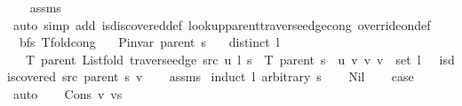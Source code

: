 \begin{isabellebody}
%
\isadelimproof
\ \ %
\endisadelimproof
%
\isatagproof
{}\isamarkupfalse%
\ assms\isanewline
\ \ \isamarkupfalse%
\ {\isacharparenleft}{\kern0pt}auto\ simp\ add{\isacharcolon}{\kern0pt}\ is{\isacharunderscore}{\kern0pt}discovered{\isacharunderscore}{\kern0pt}def\ lookup{\isacharunderscore}{\kern0pt}parent{\isacharunderscore}{\kern0pt}traverse{\isacharunderscore}{\kern0pt}edge{\isacharunderscore}{\kern0pt}cong\ override{\isacharunderscore}{\kern0pt}on{\isacharunderscore}{\kern0pt}def{\isacharparenright}{\kern0pt}%
\endisatagproof
{\isafoldproof}%
%
\isadelimproof
\isanewline
%
\endisadelimproof
\isanewline
{}\isamarkupfalse%
\ {\isacharparenleft}{\kern0pt}\ bfs{\isacharparenright}{\kern0pt}\ T{\isacharunderscore}{\kern0pt}fold{\isacharunderscore}{\kern0pt}cong{\isacharcolon}{\kern0pt}\isanewline
\ \ \ {\isachardoublequoteopen}P{\isacharunderscore}{\kern0pt}invar\ {\isacharparenleft}{\kern0pt}parent\ s{\isacharparenright}{\kern0pt}{\isachardoublequoteclose}\isanewline
\ \ \ {\isachardoublequoteopen}distinct\ l{\isachardoublequoteclose}\isanewline
\ \ \ {\isachardoublequoteopen}T\ {\isacharparenleft}{\kern0pt}parent\ {\isacharparenleft}{\kern0pt}List{\isachardot}{\kern0pt}fold\ {\isacharparenleft}{\kern0pt}traverse{\isacharunderscore}{\kern0pt}edge\ src\ u{\isacharparenright}{\kern0pt}\ l\ s{\isacharparenright}{\kern0pt}{\isacharparenright}{\kern0pt}\ {\isacharequal}{\kern0pt}\ T\ {\isacharparenleft}{\kern0pt}parent\ s{\isacharparenright}{\kern0pt}\ {\isasymunion}\ {\isacharbraceleft}{\kern0pt}{\isacharparenleft}{\kern0pt}u{\isacharcomma}{\kern0pt}\ v{\isacharparenright}{\kern0pt}\ {\isacharbar}{\kern0pt}v{\isachardot}{\kern0pt}\ v\ {\isasymin}\ set\ l\ {\isasymand}\ {\isasymnot}\ is{\isacharunderscore}{\kern0pt}discovered\ src\ {\isacharparenleft}{\kern0pt}parent\ s{\isacharparenright}{\kern0pt}\ v{\isacharbraceright}{\kern0pt}{\isachardoublequoteclose}\isanewline
%
\isadelimproof
\ \ %
\endisadelimproof
%
\isatagproof
{}\isamarkupfalse%
\ assms\isanewline
{}\isamarkupfalse%
\ {\isacharparenleft}{\kern0pt}induct\ l\ arbitrary{\isacharcolon}{\kern0pt}\ s{\isacharparenright}{\kern0pt}\isanewline
\ \ \isamarkupfalse%
\ Nil\isanewline
\ \ \isamarkupfalse%
\ {\isacharquery}{\kern0pt}case\isanewline
\ \ \ \ \isamarkupfalse%
\ auto\isanewline
{}\isamarkupfalse%
\isanewline
\ \ \isamarkupfalse%
\ {\isacharparenleft}{\kern0pt}Cons\ v\ vs{\isacharparenright}{\kern0pt}\isanewline

\end{isabellebody}

